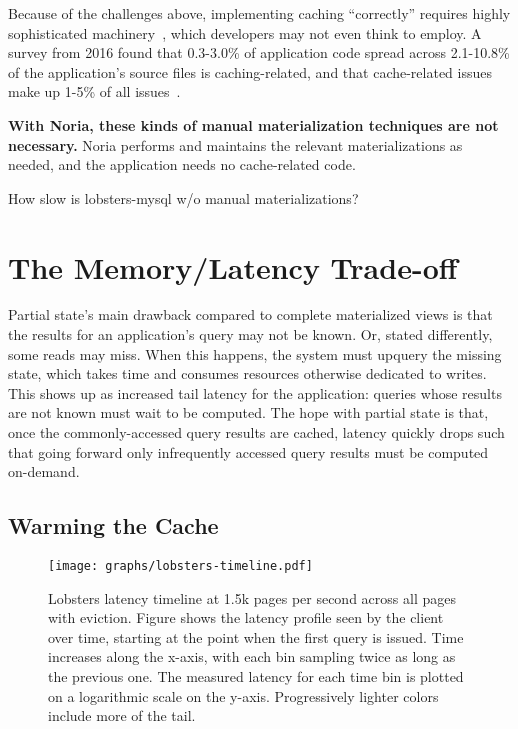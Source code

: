 Because of the challenges above, implementing caching ``correctly'' requires
highly sophisticated machinery~\cite{facebook-memcache, transactional-cache,
orm-cache, sql-cache}, which developers may not even think to employ. A survey
from 2016 found that 0.3-3.0\% of application code spread across 2.1-10.8\% of
the application's source files is caching-related, and that cache-related issues
make up 1-5\% of all issues~\cite{caching-is-hard}.

\textbf{With Noria, these kinds of manual materialization techniques are not
necessary.} Noria performs and maintains the relevant materializations as
needed, and the application needs no cache-related code.

\begin{inprogress}
  How slow is lobsters-mysql w/o manual materializations?
\end{inprogress}

\section{The Memory/Latency Trade-off}
\label{s:eval:cost}

Partial state's main drawback compared to complete materialized views is
that the results for an application's query may not be known. Or, stated
differently, some reads may miss. When this happens, the system must upquery the
missing state, which takes time and consumes resources otherwise dedicated to
writes. This shows up as increased tail latency for the application: queries
whose results are not known must wait to be computed. The hope with partial
state is that, once the commonly-accessed query results are cached, latency
quickly drops such that going forward only infrequently accessed query results
must be computed on-demand.

\subsection{Warming the Cache}

\begin{figure}[t]
  \centering
  \texttt{[image: graphs/lobsters-timeline.pdf]}
  \caption{Lobsters latency timeline at 1.5k pages per second across all pages
  with eviction. Figure shows the latency profile seen by the client over time,
  starting at the point when the first query is issued. Time increases along the
  x-axis, with each bin sampling twice as long as the previous one. The measured
  latency for each time bin is plotted on a logarithmic scale on the y-axis.
  Progressively lighter colors include more of the tail.}
  \label{f:lobsters-timeline}
\end{figure}

